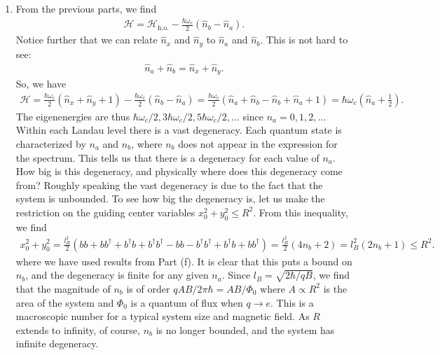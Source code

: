 \documentclass{article}
\theoremstyle{definition}
\newcommand{\ham}{\mathcal{H}}
\newcommand{\f}[2]{\frac{#1}{#2}}
\newcommand{\lp}{\left(}
\newcommand{\rp}{\right)}
\begin{document}
\begin{enumerate}[label=\alph*)]
	
	\item From the previous parts, we find
	\begin{align*}
		\ham = \ham_\text{h.o.} - \f{\hbar\omega_c}{2} (\hat{n}_b - \hat{n}_a).
	\end{align*}
	Notice further that we can relate $\hat{n}_x$ and $\hat{n}_y$ to $\hat{n}_a$ and $\hat{n}_b$. This is not hard to see:
	\begin{align*}
		\hat{n}_a + \hat{n}_b =  \hat{n}_x + \hat{n}_y.
	\end{align*}	
	So, we have
	\begin{align*}
		\ham = \f{\hbar \omega_c}{2}\lp \hat{n}_x + \hat{n}_y + 1\rp - \f{\hbar \omega_c}{2}\lp \hat{n}_b - \hat{n}_a \rp = \f{\hbar \omega_c}{2}\lp \hat{n}_a + \hat{n}_b  -  \hat{n}_b + \hat{n}_a + 1\rp = \hbar \omega_c \lp \hat{n}_a + \f{1}{2} \rp. 
	\end{align*}
	The eigenenergies are thus $\hbar \omega_c/2, 3\hbar \omega_c/2, 5\hbar \omega_c/2,\dots$ since $n_a = 0,1,2,\dots$ Within each Landau level there is a vast degeneracy. Each quantum state is characterized by $n_a$ and $n_b$, where $n_b$ does not appear in the expression for the spectrum. This tells us that there is a degeneracy for each value of $n_a$. How big is this degeneracy, and physically where does this degeneracy come from?  Roughly speaking the vast degeneracy is due to the fact that the system is unbounded. To see how big the degeneracy is, let us make the restriction on the guiding center variables $x_0^2 + y_0^2 \leq R^2$. From this inequality, we find 
	\begin{align*}
	x_0^2 + y_0^2 = \f{l_B^2}{2}\lp bb + bb^\dagger + b^\dagger b + b^\dagger b^\dagger -bb - b^\dagger b^\dagger + b^\dagger b + bb^\dagger \rp =  \f{l_B^2}{2}(4n_b + 2) = l_B^2(2n_b+1) \leq R^2.
	\end{align*}
	where we have used results from Part (f). It is clear that this puts a bound on $n_b$, and the degeneracy is finite for any given $n_a$. Since $l_B = \sqrt{2\hbar / qB}$, we find that the magnitude of $n_b$ is of order $qAB/2\pi\hbar = AB/\Phi_0$ where $A \propto R^2$ is the area of the system and $\Phi_0$ is a quantum of flux when $q\to e$. This is a macroscopic number for a typical system size and magnetic field. As $R$ extends to infinity, of course, $n_b$ is no longer bounded, and the system has infinite degeneracy. 


\end{enumerate}
\end{document}
